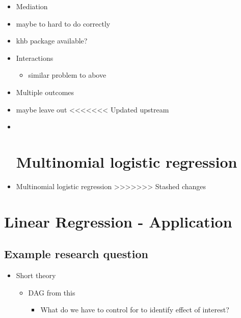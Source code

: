 \documentclass[
]{book}
\providecommand{\tightlist}{%
  \setlength{\itemsep}{0pt}\setlength{\parskip}{0pt}}
\begin{document}
\begin{itemize}
\item
  Mediation
\item
  maybe to hard to do correctly
\item
  khb package available?
\item
  Interactions

  \begin{itemize}
  \tightlist
  \item
    similar problem to above
  \end{itemize}
\item
  Multiple outcomes
\item
  maybe leave out
  \textless\textless\textless\textless\textless\textless\textless{} Updated upstream
\item ~
  \hypertarget{multinomial-logistic-regression}{%
  \chapter{Multinomial logistic regression}\label{multinomial-logistic-regression}}
\item
  Multinomial logistic regression
  \textgreater\textgreater\textgreater\textgreater\textgreater\textgreater\textgreater{} Stashed changes
\end{itemize}

\hypertarget{lin-a}{%
\chapter{Linear Regression - Application}\label{lin-a}}

\hypertarget{example-research-question}{%
\section{Example research question}\label{example-research-question}}

\begin{itemize}
\tightlist
\item
  Short theory

  \begin{itemize}
  \tightlist
  \item
    DAG from this

    \begin{itemize}
    \tightlist
    \item
      What do we have to control for to identify effect of interest?
    \end{itemize}
  \end{itemize}
\end{itemize}
\end{document}
